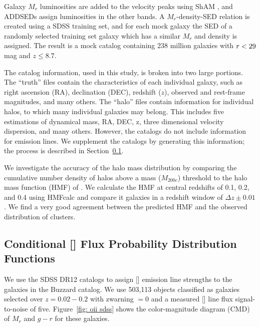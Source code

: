 \documentclass[fleqn,usenatbib]{mnras}
\begin{document}
Galaxy $M_r$ luminosities are added to the velocity peaks using ShAM \citep{Reddick2013}, and ADDSEDs assign luminosities in the other bands. A $M_r$-density-SED relation is created using a SDSS training set, and for each mock galaxy the SED of a randomly selected training set galaxy which has a similar $M_r$ and density is assigned. The result is a mock catalog containing 238 million galaxies with $\hbox{$r$} < 29$ mag and $z \leq 8.7$.

The catalog information, used in this study, is broken into two large portions. The ``truth'' files contain the characteristics of each individual galaxy, such as right ascension (RA), declination (DEC), redshift ($z$), observed and rest-frame magnitudes, and many others. The ``halo'' files contain information for individual halos, to which many individual galaxies may belong. This includes five estimations of dynamical mass, RA, DEC, z, three dimensional velocity dispersion, and many others. However, the catalogs do not include information for emission lines. We supplement the catalogs by generating this information; the process is described in Section~\ref{sec: oii luminosity}.


We investigate the accuracy of the halo mass distribution by comparing the cumulative number density of halos above a mass ($M_{200c}$) threshold to the halo mass function (HMF) of \cite{Tinker2008}. We calculate the HMF at central redshifts of 0.1, 0.2, and 0.4 using {\sc HMFcalc} \citep{Murray2013} and compare it galaxies in a redshift window of $\Delta z\pm0.01$. We find a very good agreement between the predicted HMF and the observed distribution of clusters.

\subsection{Conditional [] Flux Probability Distribution Functions}\label{sec: oii luminosity}
We use the SDSS DR12 \citep{Alam2015} catalogs to assign \hbox{[]} emission line strengths to the galaxies in the Buzzard catalog. We use 503,113 objects classified as galaxies selected over $z = 0.02 - 0.2$ with {\sc zwarning $=0$} and a measured \hbox{[]} line flux signal-to-noise of five. Figure~\ref{fig: oii sdss} shows the color-magnitude diagram (CMD) of $M_r$ and $g-r$ for these galaxies.
\end{document}
